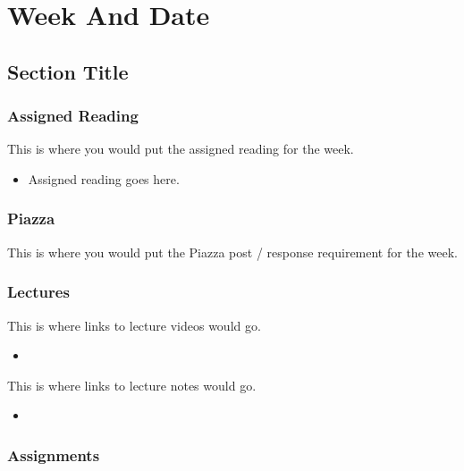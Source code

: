 \clearpage

\newcommand{\ChapTitle}{Week And Date}
\newcommand{\SectionTitle}{Section Title}

\chapter{\ChapTitle}

\section{\SectionTitle}

\subsection{Assigned Reading}

This is where you would put the assigned reading for the week.

\begin{itemize}
    \item Assigned reading goes here.
\end{itemize}

\subsection{Piazza}

This is where you would put the Piazza post / response requirement for the week. 

\subsection{Lectures}

This is where links to lecture videos would go.

\begin{itemize}
    \item {}
\end{itemize}

\noindent This is where links to lecture notes would go.

\begin{itemize}
    \item {}
\end{itemize}

\subsection{Assignments}

